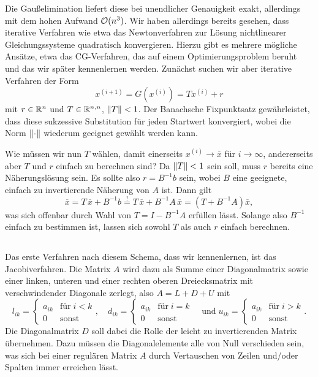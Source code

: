 Die Gaußelimination liefert diese bei unendlicher Genauigkeit exakt,
allerdings mit dem hohen Aufwand $\mathcal O(n^3)$. Wir haben allerdings
bereits gesehen, dass iterative Verfahren wie etwa das Newtonverfahren
zur Lösung nichtlinearer Gleichungssysteme quadratisch
konvergieren. Hierzu gibt es mehrere mögliche Ansätze, etwa das
CG-Verfahren, das auf einem Optimierungsproblem beruht und das wir
später kennenlernen werden. Zunächst suchen wir aber iterative
Verfahren der Form
\begin{equation}
  \label{eq:itgl}
  x^{(i+1)} = G(x^{(i)}) = T x^{(i)} + r
\end{equation}
mit $r\in\mathbb{R}^n$ und $T\in\mathbb{R}^{n,n}$, $\left\lVert{T}\right\rVert<1$. Der Banachsche
Fixpunktsatz gewährleistet, dass diese sukzessive Substitution für
jeden Startwert konvergiert, wobei die Norm $\left\lVert{\cdot}\right\rVert$ wiederum
geeignet gewählt werden kann.

Wie müssen wir nun $T$ wählen, damit einerseits $x^{(i)}\to \overline{x}$
für $i\to\infty$, andererseits aber $T$ und $r$ einfach zu berechnen
sind? Da $\left\lVert{T}\right\rVert < 1$ sein soll, muss $r$ bereits eine
Näherungslösung sein. Es sollte also $r = B^{-1}b$ sein, wobei $B$
eine geeignete, einfach zu invertierende Näherung von $A$ ist. Dann
gilt
\begin{equation}
  \overline{x} = T\,\overline{x} +
  B^{-1}b
  \stackrel{!}{=} T\,\overline{x} +
  B^{-1}A\,\overline{x}
  = \left(T + B^{-1}A\right)\overline{x},
\end{equation}
was sich offenbar durch Wahl von $T = I - B^{-1}A$ erfüllen
lässt. Solange also $B^{-1}$ einfach zu bestimmen ist, lassen sich
sowohl $T$ als auch $r$ einfach berechnen.

\subsection{}

Das erste Verfahren nach diesem Schema, dass wir kennenlernen, ist
das Jacobiverfahren. Die Matrix $A$ wird dazu als Summe einer
Diagonalmatrix sowie einer linken, unteren und einer rechten oberen
Dreiecksmatrix mit verschwindender Diagonale zerlegt, also $A = L + D
+ U$ mit
\begin{equation}
  l_{ik}=
  \begin{cases}
    a_{ik} & \text{für}\; i<k\\
    0 & \text{sonst}
  \end{cases},\quad
  d_{ik} =
  \begin{cases}
    a_{ik} & \text{für}\; i=k\\
    0 & \text{sonst}
  \end{cases}\quad\text{und}\;
  u_{ik} =
  \begin{cases}
    a_{ik} & \text{für}\; i>k\\
    0 & \text{sonst}
  \end{cases}.
\end{equation}
Die Diagonalmatrix $D$ soll dabei die Rolle der leicht zu
invertierenden Matrix übernehmen. Dazu müssen die Diagonalelemente
alle von Null verschieden sein, was sich bei einer regulären Matrix
$A$ durch Vertauschen von Zeilen und/oder Spalten immer erreichen
lässt.

